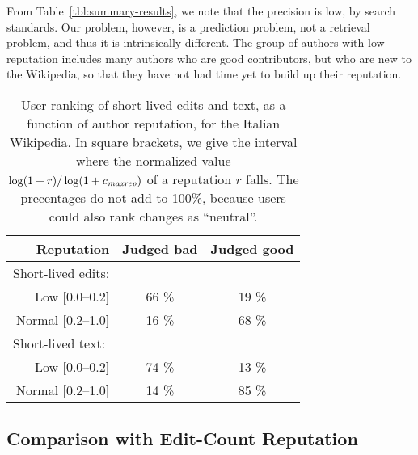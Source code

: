 From Table~\ref{tbl:summary-results}, we note that the precision is
low, by search standards.
Our problem, however, is a prediction problem, not a retrieval
problem, and thus it is intrinsically different. 
The group of authors with low reputation includes many authors who are
good contributors, but who are new to the Wikipedia, so that they have
not had time yet to build up their reputation.


\begin{table}
\begin{center}
\begin{tabular}{|r|c|c|} \hline
\qquad \qquad Reputation & Judged bad & Judged good \\ \hline
\multicolumn{1}{|l|}{Short-lived edits: \qquad \quad} & & \\[1ex]
   Low [0.0--0.2]   &    66  \% &    19 \% \\
Normal [0.2--1.0]   &    16  \% &    68 \% \\ \hline
\multicolumn{1}{|l|}{Short-lived text: \qquad \quad} & & \\[1ex]
   Low [0.0--0.2]   &    74  \% &    13 \% \\
Normal [0.2--1.0]   &    14  \% &    85 \% \\ \hline
\end{tabular}
\end{center}
\caption{User ranking of short-lived edits and text, as a
  function of author reputation, for the Italian Wikipedia.  
  In square brackets, we give the
  interval where the normalized value $\log(1+r) / \log (1 +
  {c_{{\text{\textit{maxrep}}}}})$ of a reputation $r$ falls.  The precentages do not
  add to 100\%, because users could also rank changes as ``neutral''.} 
\label{tbl:human}
\end{table}

\subsection{Comparison with Edit-Count Reputation}

